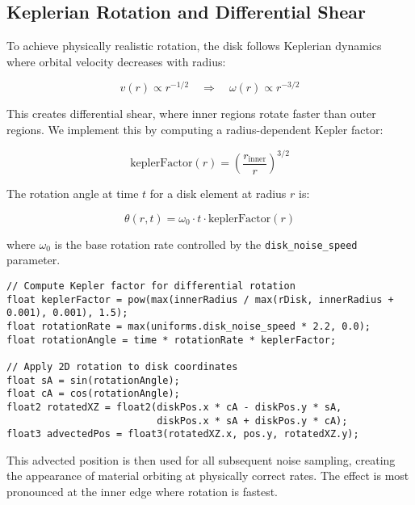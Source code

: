 \documentclass[12pt,a4paper]{article}
\theoremstyle{definition}
\theoremstyle{remark}
\begin{document}
\subsection{Keplerian Rotation and Differential Shear}

To achieve physically realistic rotation, the disk follows Keplerian dynamics where orbital velocity decreases with radius:

\begin{equation}
    v(r) \propto r^{-1/2} \quad \Rightarrow \quad \omega(r) \propto r^{-3/2}
\end{equation}

This creates differential shear, where inner regions rotate faster than outer regions. We implement this by computing a radius-dependent Kepler factor:

\begin{equation}
    \text{keplerFactor}(r) = \left(\frac{r_{\text{inner}}}{r}\right)^{3/2}
\end{equation}

The rotation angle at time $t$ for a disk element at radius $r$ is:

\begin{equation}
    \theta(r, t) = \omega_0 \cdot t \cdot \text{keplerFactor}(r)
\end{equation}

where $\omega_0$ is the base rotation rate controlled by the \texttt{disk\_noise\_speed} parameter.

\begin{lstlisting}[style=metalstyle, caption=Keplerian shear implementation]
// Compute Kepler factor for differential rotation
float keplerFactor = pow(max(innerRadius / max(rDisk, innerRadius + 0.001), 0.001), 1.5);
float rotationRate = max(uniforms.disk_noise_speed * 2.2, 0.0);
float rotationAngle = time * rotationRate * keplerFactor;

// Apply 2D rotation to disk coordinates
float sA = sin(rotationAngle);
float cA = cos(rotationAngle);
float2 rotatedXZ = float2(diskPos.x * cA - diskPos.y * sA,
                          diskPos.x * sA + diskPos.y * cA);
float3 advectedPos = float3(rotatedXZ.x, pos.y, rotatedXZ.y);
\end{lstlisting}

This advected position is then used for all subsequent noise sampling, creating the appearance of material orbiting at physically correct rates. The effect is most pronounced at the inner edge where rotation is fastest.
\end{document}
